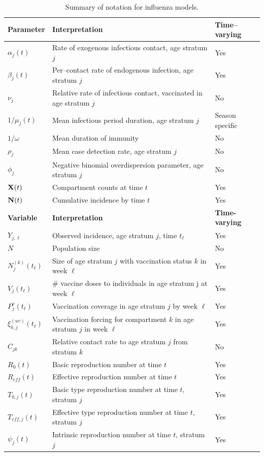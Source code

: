 \begin{table}[htbp]
	\caption{Summary of notation for influenza models.}
	\label{tab:flu_notation}
	\footnotesize
	\centering
	\begin{tabular}{lll}
		\hline
		\textbf{Parameter} & \textbf{Interpretation} & \textbf{Time--varying}\\
		\hline
		$\alpha_j(t)$ & Rate of exogenous infectious contact, age stratum $ j $ & Yes \\
		$ \beta_j(t) $ & Per--contact rate of endogenous infection, age stratum $ j $ & Yes \\
		$ \nu_j $ & Relative rate of infectious contact, vaccinated in age stratum $ j $ & No \\
		$1/\mu_j(t)$ & Mean infectious period duration, age stratum $ j $ & Season specific\\
		$ 1/\omega $ & Mean duration of immunity & No \\
		$ \rho_j $ & Mean case detection rate, age stratum $ j $ & No\\
		$ \phi_j $ & Negative binomial overdispersion parameter, age stratum $ j $ & No \\
		$ \mathbf{X}(t) $ & Compartment counts at time $ t $ & Yes\\
		$ \mathbf{N}(t) $ & Cumulative incidence by time $ t $ & Yes \\
		\hline \hline
		\textbf{Variable} & \textbf{Interpretation} & \textbf{Time-varying}\\
		\hline		
		$ Y_{j,\ell} $ & Observed incidence, age stratum $ j $, time $ t_\ell $ & Yes \\
		$ N$ & Population size & No\\
		$ N_{j}^{(k)}(t_\ell) $ & Size of age stratum $ j $ with vaccination status $ k $ in week $ \ell $ & Yes \\
		$ V_{j}(t_\ell) $ & \# vaccine doses to individuals in age stratum j at week $ \ell $ & Yes\\	
		$ P^v_{j}(t_\ell) $ & Vaccination coverage in age stratum $ j $ by week $ \ell $ & Yes \\
		$ \xi_{k,j}^{(uv)}(t_\ell) $ & Vaccination forcing for compartment $ k $ in age stratum $ j $ in week $ \ell $ & Yes\\
		$ C_{jk} $ & Relative contact rate to age stratum $ j $ from stratum $ k $ & No\\
		$ R_0(t) $ & Basic reproduction number at time $ t $ & Yes \\
		$ R_{eff}(t) $ & Effective reproduction number at time $ t $ & Yes \\
		$ T_{0,j}(t) $ & Basic type reproduction number at time $ t $, stratum $ j $ & Yes \\
		$ T_{eff,j}(t) $ & Effective type reproduction number at time $ t $, stratum $ j $ & Yes \\
		$ \psi_j(t) $ & Intrinsic reproduction number at time $ t $, stratum $ j $ & Yes\\
		\hline
	\end{tabular}
\end{table}

